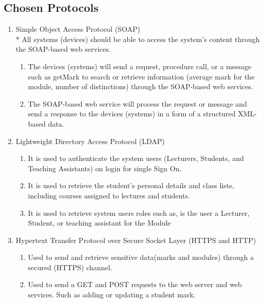 \documentclass[12pt]{article}
\begin{document}
		\subsection{Chosen Protocols}
			\begin{enumerate}
	                    \item Simple Object Access Protocol (SOAP) \\*
	                    All systems (devices) should be able to access the system’s content through the SOAP-based web services. 
	                        \begin{enumerate}
	                            \item The devices (systems) will send a request, procedure call, or a message such as getMark to search or retrieve information (average mark for the module, number of distinctions) through the SOAP-based web services.
	                            \item The SOAP-based web service will process the request or message and send a response to the devices (systems) in a form of a structured XML-based data.
	                        \end{enumerate}
	                    \item Lightweight Directory Access Protocol (LDAP)
	                        \begin{enumerate}
	                            \item It is used to authenticate the system users (Lecturers, Students, and Teaching Assistants) on login for single Sign On.
	                            \item It is used to retrieve the student’s personal details and class lists, including courses assigned to lectures and students.
	                            \item It is used to retrieve system users roles such as, is the user a Lecturer, Student, or teaching assistant for the Module
	                        \end{enumerate}
	                    \item  Hypertext Transfer Protocol over Secure Socket Layer (HTTPS and HTTP)
	                        \begin{enumerate}
	                            \item Used to send and retrieve sensitive data(marks and modules) through a secured (HTTPS) channel.
	                            \item Used to send a GET and POST requests to the web server and web services. Such as adding or updating a student mark.
	                        \end{enumerate}
	                        
              		\end{enumerate}
			\vspace{0.2in}
			
\end{document}
